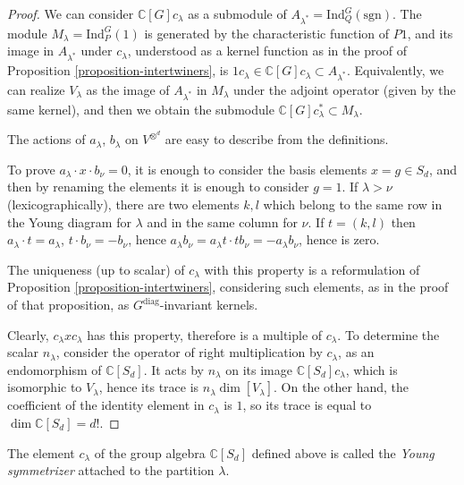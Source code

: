\begin{proof}
We can consider $\mathbb C[G] c_\lambda$ as a submodule of $A_{\lambda^*} = \text{Ind}_Q^G (\text{sgn})$. 
The module $M_\lambda = \text{Ind}_P^G (1)$ is generated by the characteristic function of $P1$, and its image in $A_{\lambda^*}$ under $c_\lambda$, understood as a kernel function as in the proof of Proposition \ref{proposition-intertwiners}, is $1c_\lambda \in \mathbb C[G] c_\lambda\subset A_{\lambda^*}$. Equivalently, we can realize $V_\lambda$ as the image of $A_{\lambda^*}$ in $M_\lambda$ under the adjoint operator (given by the same kernel), and then we obtain the submodule $\mathbb C[G] c_\lambda^*\subset M_\lambda$.

The actions of $a_\lambda$, $b_\lambda$ on $V^{\otimes^d}$ are easy to describe from the definitions.

To prove $a_\lambda \cdot x \cdot b_\nu =0$, it is enough to consider the basis elements $x=g\in S_d$, and then by renaming the elements it is enough to consider $g=1$. If $\lambda>\nu$ (lexicographically), there are two elements $k, l$ which belong to the same row in the Young diagram for $\lambda$ and in the same column for $\nu$. If $t=(k,l)$ then $a_\lambda\cdot t = a_\lambda$, $t\cdot b_\nu = -b_\nu$, hence $a_\lambda b_\nu = a_\lambda t \cdot tb_\nu = -a_\lambda b_\nu$, hence is zero. 

The uniqueness (up to scalar) of $c_\lambda$ with this property is a reformulation of Proposition \ref{proposition-intertwiners}, considering such elements, as in the proof of that proposition, as $G^{\text{diag}}$-invariant kernels. 

Clearly, $c_\lambda x c_\lambda$ has this property, therefore is a multiple of $c_\lambda$. To determine the scalar $n_\lambda$, consider the operator of right multiplication by $c_\lambda$, as an endomorphism of $\mathbb C[S_d]$. It acts by $n_\lambda$ on its image $\mathbb C[S_d]c_\lambda$, which is isomorphic to $V_\lambda$, hence its trace is $n_\lambda \dim[V_\lambda]$. On the other hand, the coefficient of the identity element in $c_\lambda$ is $1$, so its trace is equal to $\dim \mathbb C[S_d] = d!$. 
\end{proof}





\begin{definition}
\label{definition-Young-symmetrizer}
The element $c_\lambda$ of the group algebra $\mathbb C[S_d]$ defined above is called the {\it Young symmetrizer} attached to the partition $\lambda$.
\end{definition}



